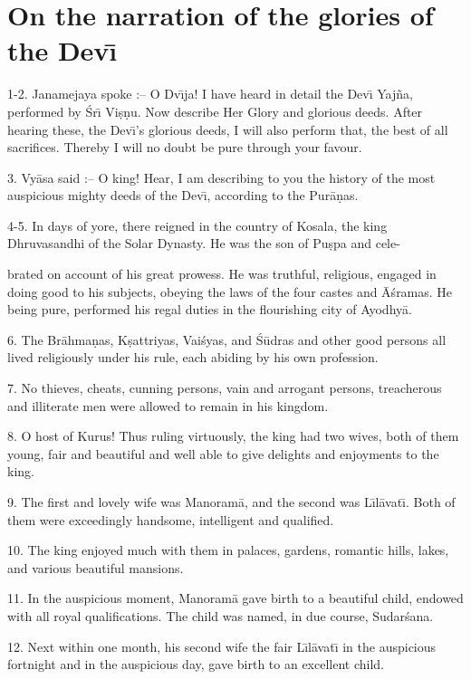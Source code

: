 \chapter{On the narration of the glories of the Dev\={\i}}

1-2. Janamejaya spoke :-- O Dv\={\i}ja! I have heard in detail the Dev\={\i} Yaj\~na, performed by \'Sr\={\i} Vi\d{s}\d{n}u. Now describe Her Glory and glorious deeds. After hearing these, the Dev\={\i}'s glorious deeds, I will also perform that, the best of all sacrifices. Thereby I will no doubt be pure through your favour.

3. Vy\=asa said :-- O king! Hear, I am describing to you the history of the most auspicious mighty deeds of the Dev\={\i}, according to the Pur\=a\d{n}as.

4-5. In days of yore, there reigned in the country of Kosala, the king Dhruvasandhi of the Solar Dynasty. He was the son of Pu\d{s}pa and cele-

brated on account of his great prowess. He was truthful, religious, engaged in doing good to his subjects, obeying the laws of the four castes and \=A\'sramas. He being pure, performed his regal duties in the flourishing city of Ayodhy\=a.

6. The Br\=ahma\d{n}as, K\d{s}attriyas, Vai\'syas, and \'S\=udras and other good persons all lived religiously under his rule, each abiding by his own profession.

7. No thieves, cheats, cunning persons, vain and arrogant persons, treacherous and illiterate men were allowed to remain in his kingdom.

8. O host of Kurus! Thus ruling virtuously, the king had two wives, both of them young, fair and beautiful and well able to give delights and enjoyments to the king.

9. The first and lovely wife was Manoram\=a, and the second was L\={\i}l\=avat\={\i}. Both of them were exceedingly handsome, intelligent and qualified.

10. The king enjoyed much with them in palaces, gardens, romantic hills, lakes, and various beautiful mansions.

11. In the auspicious moment, Manoram\=a gave birth to a beautiful child, endowed with all royal qualifications. The child was named, in due course, Sudar\'sana.

12. Next within one month, his second wife the fair L\={\i}l\=avat\={\i} in the auspicious fortnight and in the auspicious day, gave birth to an excellent child.

